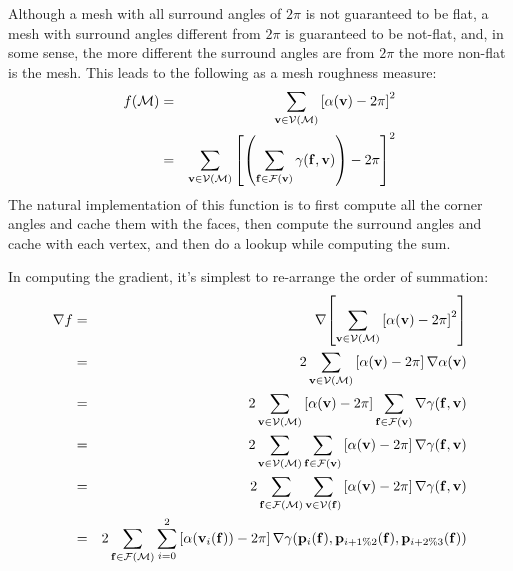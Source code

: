 Although a mesh with all surround angles of $2\pi$ is not guaranteed
to be flat,
a mesh with surround angles different from $2\pi$ is guaranteed
to be not-flat,
and, in some sense,
the more different the surround angles are from $2\pi$
the more non-flat is the mesh.
This leads to the following as a mesh roughness measure:
\begin{eqnarray}
f({\mathcal M})
& = & \sum_{{\mathbf v} \in {\mathcal V}({\mathcal M})} \left[ \alpha({\mathbf v}) - 2\pi \right]^2
\\
& = & \sum_{{\mathbf v} \in {\mathcal V}({\mathcal M})}
\left[ \left(\sum_{{\mathbf f} \in {\mathcal F}({\mathbf v})} \gamma({\mathbf f},{\mathbf v})\right)
 - 2\pi \right]^2
\nonumber
\end{eqnarray}
The natural implementation of this function is to first compute
all the corner angles and cache them with the faces,
then compute the surround angles and cache with each vertex,
and then do a lookup while computing the sum.

In computing the gradient, it's simplest to re-arrange the
order of summation:
\begin{eqnarray}
{\mathbf \nabla}{f}
& = & {\mathbf \nabla}{ \left[ \sum_{{\mathbf v} \in {\mathcal V}({\mathcal M})} \left[ \alpha({\mathbf v}) - 2\pi \right]^2 \right]}
\\
& = & 2 \sum_{{\mathbf v} \in {\mathcal V}({\mathcal M})} \left[ \alpha({\mathbf v}) - 2\pi \right] {\mathbf \nabla}{\alpha({\mathbf v})}
\nonumber
\\
& = & 2 \sum_{{\mathbf v} \in {\mathcal V}({\mathcal M})} \left[ \alpha({\mathbf v}) - 2\pi \right]
\sum_{{\mathbf f} \in {\mathcal F}({\mathbf v})} {\mathbf \nabla}{\gamma({\mathbf f},{\mathbf v})}
\nonumber
\\
& = & 2 \sum_{{\mathbf v} \in {\mathcal V}({\mathcal M})}
\sum_{{\mathbf f} \in {\mathcal F}({\mathbf v})}
\left[ \alpha({\mathbf v}) - 2\pi \right]
{\mathbf \nabla}{\gamma({\mathbf f},{\mathbf v})}
\nonumber
\\
& = & 2
\sum_{{\mathbf f} \in {\mathcal F}({\mathcal M})}
\sum_{{\mathbf v} \in {\mathcal V}({\mathbf f})}
\left[ \alpha({\mathbf v}) - 2\pi \right]
{\mathbf \nabla}{\gamma({\mathbf f},{\mathbf v})}
\nonumber
\\
& = & 2
\sum_{{\mathbf f} \in {\mathcal F}({\mathcal M})}
\sum_{i=0}^2
\left[ \alpha({\mathbf v}_i({\mathbf f})) - 2\pi \right]
{\mathbf \nabla}{\gamma({\mathbf p}_i({\mathbf f}),{\mathbf p}_{i+1 \% 2}({\mathbf f}),{\mathbf p}_{i+2 \% 3}({\mathbf f}))}
\nonumber
\end{eqnarray}

